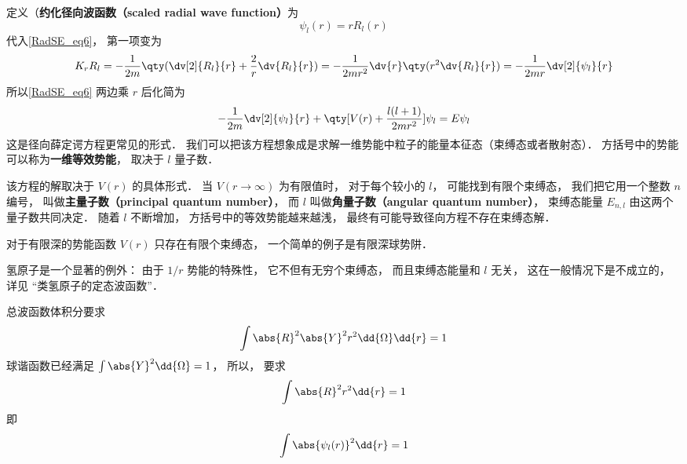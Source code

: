 定义（\textbf{约化径向波函数（scaled radial wave function）}为
\begin{equation}
\psi_l(r) = r R_l(r)
\end{equation}
代入\autoref{RadSE_eq6}， 第一项变为
\begin{equation}
K_r R_l =  - \frac{1}{2m} \qty(\dv[2]{R_l}{r} + \frac2r \dv{R_l}{r}) = -\frac{1}{2mr^2} \dv{r} \qty(r^2\dv{R_l}{r}) =  -\frac{1}{2mr} \dv[2]{\psi_l}{r}
\end{equation}
所以\autoref{RadSE_eq6} 两边乘 $r$ 后化简为
\begin{equation}\label{RadSE_eq1}
-\frac{1}{2m} \dv[2]{\psi_l}{r} + \qty[V(r) + \frac{l(l + 1)}{2mr^2}]\psi_l = E\psi_l
\end{equation}
这是径向薛定谔方程更常见的形式． 我们可以把该方程想象成是求解一维势能中粒子的能量本征态（束缚态或者散射态）． 方括号中的势能可以称为\textbf{一维等效势能}， 取决于 $l$ 量子数．

该方程的解取决于 $V(r)$ 的具体形式． 当 $V(r\to \infty)$ 为有限值时， 对于每个较小的 $l$， 可能找到有限个束缚态， 我们把它用一个整数 $n$ 编号， 叫做\textbf{主量子数（principal quantum number）}， 而 $l$ 叫做\textbf{角量子数（angular quantum number）}， 束缚态能量 $E_{n,l}$ 由这两个量子数共同决定． 随着 $l$ 不断增加， 方括号中的等效势能越来越浅， 最终有可能导致径向方程不存在束缚态解．

对于有限深的势能函数 $V(r)$ 只存在有限个束缚态， 一个简单的例子是有限深球势阱．

氢原子是一个显著的例外： 由于 $1/r$ 势能的特殊性， 它不但有无穷个束缚态， 而且束缚态能量和 $l$ 无关， 这在一般情况下是不成立的， 详见 “类氢原子的定态波函数”．


总波函数体积分要求
\begin{equation}
\int \abs{R}^2 \abs{Y}^2 r^2 \dd{\Omega}\dd{r}  = 1
\end{equation}
球谐函数已经满足 $\int \abs{Y}^2 \dd{\Omega} = 1$，  所以， 要求
\begin{equation}
\int \abs{R}^2 r^2 \dd{r}  = 1
\end{equation}
即
\begin{equation}
\int \abs{\psi_l(r)}^2 \dd{r}  = 1
\end{equation}
